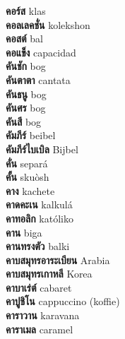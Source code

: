 \textbf{ คอร์ส  } klas \\
\textbf{ คอลเลคชั่น  } kolekshon \\
\textbf{ คอสต์  } bal \\
\textbf{ คอแข็ง  } capacidad \\
\textbf{ คันชัก  } bog \\
\textbf{ คันตาตา  } cantata \\
\textbf{ คันธนู  } bog \\
\textbf{ คันศร  } bog \\
\textbf{ คันสี  } bog \\
\textbf{ คัมภีร์  } beibel \\
\textbf{ คัมภีร์ไบเบิล  } Bijbel \\
\textbf{ คั่น  } separá \\
\textbf{ คั้น  } skuòsh \\
\textbf{ คาง  } kachete \\
\textbf{ คาดคะเน  } kalkulá \\
\textbf{ คาทอลิก  } katóliko \\
\textbf{ คาน  } biga \\
\textbf{ คานทรงตัว  } balki \\
\textbf{ คาบสมุทรอาระเบียน  } Arabia \\
\textbf{ คาบสมุทรเกาหลี  } Korea \\
\textbf{ คาบาเร่ต์  } cabaret \\
\textbf{ คาปูชิโน  } cappuccino (koffie) \\
\textbf{ คาราวาน  } karavana \\
\textbf{ คาราเมล  } caramel \\
